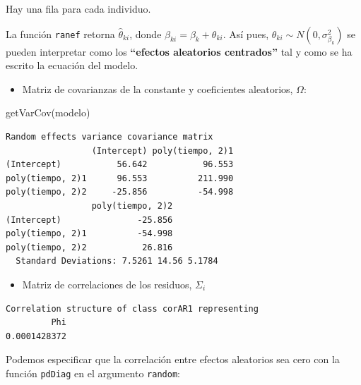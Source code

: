 \documentclass[
]{book}
\newenvironment{Shaded}{\begin{snugshade}}{\end{snugshade}}
\newcommand{\FunctionTok}[1]{\textcolor[rgb]{0.00,0.00,0.00}{#1}}
\newcommand{\NormalTok}[1]{#1}
\newcommand{\SpecialCharTok}[1]{\textcolor[rgb]{0.00,0.00,0.00}{#1}}
\providecommand{\tightlist}{%
  \setlength{\itemsep}{0pt}\setlength{\parskip}{0pt}}
\begin{document}
Hay una fila para cada individuo.

La función \texttt{ranef} retorna \(\hat{\theta}_{ki}\), donde \(\beta_{ki} = \beta_k + \theta_{ki}\). Así pues, \(\theta_{ki} \sim N\left(0,\sigma_{\beta_{k}}^2\right)\) se pueden interpretar como los \textbf{``efectos aleatorios centrados''} tal y como se ha escrito la ecuación del modelo.

\begin{itemize}
\tightlist
\item
  Matriz de covarianzas de la constante y coeficientes aleatorios, \(\Omega\):
\end{itemize}

\begin{Shaded}
\begin{Highlighting}[]
\FunctionTok{getVarCov}\NormalTok{(modelo)}
\end{Highlighting}
\end{Shaded}

\begin{verbatim}
Random effects variance covariance matrix
                 (Intercept) poly(tiempo, 2)1
(Intercept)           56.642           96.553
poly(tiempo, 2)1      96.553          211.990
poly(tiempo, 2)2     -25.856          -54.998
                 poly(tiempo, 2)2
(Intercept)               -25.856
poly(tiempo, 2)1          -54.998
poly(tiempo, 2)2           26.816
  Standard Deviations: 7.5261 14.56 5.1784 
\end{verbatim}

\begin{itemize}
\tightlist
\item
  Matriz de correlaciones de los residuos, \(\Sigma_i\)
\end{itemize}

\begin{Shaded}
\end{Shaded}

\begin{verbatim}
Correlation structure of class corAR1 representing
         Phi 
0.0001428372 
\end{verbatim}

Podemos especificar que la correlación entre efectos aleatorios sea cero con la función \texttt{pdDiag} en el argumento \texttt{random}:
\end{document}
